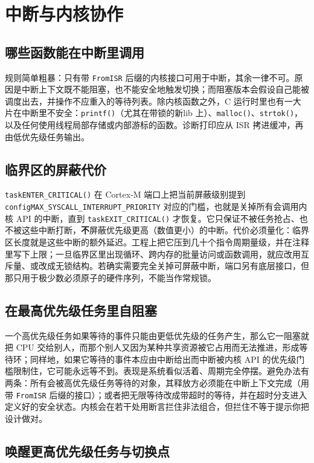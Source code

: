 \documentclass[12pt,a4paper,fontset=fandol]{ctexbook}
\newcommand{\Fn}[1]{\texttt{#1()}}
\newcommand{\Tp}[1]{\texttt{#1}}
\newcommand{\Bk}{\discretionary{}{}{}}
\begin{document}
\section{中断与内核协作}

\subsection{哪些函数能在中断里调用}

规则简单粗暴：只有带 \Tp{FromISR} 后缀的内核接口可用于中断，其余一律不可。原因是中断上下文既不能阻塞，也不能安全地触发切换；而阻塞版本会假设自己能被调度出去，并操作不应重入的等待列表。除内核函数之外，C 运行时里也有一大片在中断里不安全：\Fn{printf}（尤其在带锁的新lib 上）、\Fn{malloc}、\Fn{strtok}，以及任何使用线程局部存储或内部游标的函数。诊断打印应从 ISR 拷进缓冲，再由低优先级任务输出。

\subsection{临界区的屏蔽代价}

\Fn{task{\Bk}ENTER\_{\Bk}CRITICAL} 在 Cortex-M 端口上把当前屏蔽级别提到 \Tp{config{\Bk}MAX\_{\Bk}SYSCALL\_{\Bk}INTERRUPT\_{\Bk}PRIORITY} 对应的门槛，也就是关掉所有会调用内核 API 的中断，直到 \Fn{task{\Bk}EXIT\_{\Bk}CRITICAL} 才恢复。它只保证不被任务抢占、也不被这些中断打断，\textbf{不}屏蔽优先级更高（数值更小）的中断。代价必须量化：临界区长度就是这些中断的额外延迟。工程上把它压到几十个指令周期量级，并在注释里写下上限；一旦临界区里出现循环、跨内存的批量访问或函数调用，就应改用互斥量、或改成无锁结构。若确实需要完全关掉可屏蔽中断，端口另有底层接口，但那只用于极少数必须原子的硬件序列，不能当作常规锁。

\subsection{在最高优先级任务里自阻塞}

一个高优先级任务如果等待的事件只能由更低优先级的任务产生，那么它一阻塞就把 CPU 交给别人，而那个别人又因为某种共享资源被它占用而无法推进，形成等待环；同样地，如果它等待的事件本应由中断给出而中断被内核 API 的优先级门槛限制住，它可能永远等不到。表现是系统看似活着、周期完全停摆。避免办法有两条：所有会被高优先级任务等待的对象，其释放方必须能在中断上下文完成（用带 \Tp{FromISR} 后缀的接口）；或者把无限等待改成带超时的等待，并在超时分支进入定义好的安全状态。内核会在若干处用断言拦住非法组合，但拦住不等于提示你把设计做对。

\subsection{唤醒更高优先级任务与切换点}
\end{document}
